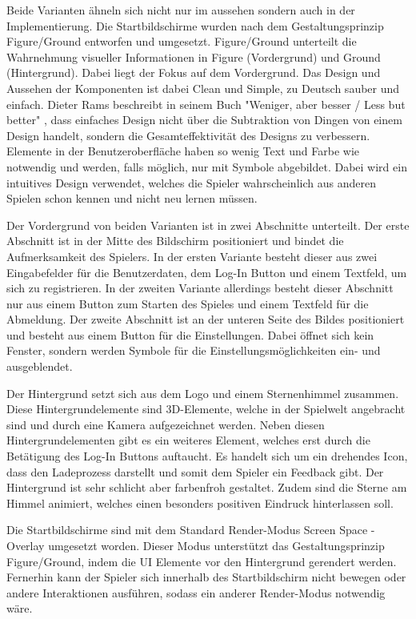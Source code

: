 			Beide Varianten ähneln sich nicht nur im aussehen sondern auch in der Implementierung. Die Startbildschirme wurden nach dem Gestaltungsprinzip Figure/Ground entworfen und umgesetzt. Figure/Ground unterteilt die Wahrnehmung visueller Informationen in Figure (Vordergrund) und Ground (Hintergrund). Dabei liegt der Fokus auf dem Vordergrund. Das Design und Aussehen der Komponenten ist dabei Clean und Simple, zu Deutsch sauber und einfach. Dieter Rams beschreibt in seinem Buch "Weniger, aber besser / Less but better" \cite{ramsDesign}, dass einfaches Design nicht über die Subtraktion von Dingen von einem Design handelt, sondern die Gesamteffektivität des Designs zu verbessern. Elemente in der Benutzeroberfläche haben so wenig Text und Farbe wie notwendig und werden, falls möglich, nur mit Symbole abgebildet. Dabei wird ein intuitives Design verwendet, welches die Spieler wahrscheinlich aus anderen Spielen schon kennen und nicht neu lernen müssen.
			
			Der Vordergrund von beiden Varianten ist in zwei Abschnitte unterteilt. Der erste Abschnitt ist in der Mitte des Bildschirm positioniert und bindet die Aufmerksamkeit des Spielers. In der ersten Variante besteht dieser aus zwei Eingabefelder für die Benutzerdaten, dem Log-In Button und einem Textfeld, um sich zu registrieren. In der zweiten Variante allerdings besteht dieser Abschnitt nur aus einem Button zum Starten des Spieles und einem Textfeld für die Abmeldung. Der zweite Abschnitt ist an der unteren Seite des Bildes positioniert und besteht aus einem Button für die Einstellungen. Dabei öffnet sich kein Fenster, sondern werden Symbole für die Einstellungsmöglichkeiten ein- und ausgeblendet.
			
			Der Hintergrund setzt sich aus dem Logo und einem Sternenhimmel zusammen. Diese Hintergrundelemente sind 3D-Elemente, welche in der Spielwelt angebracht sind und durch eine Kamera aufgezeichnet werden. Neben diesen Hintergrundelementen gibt es ein weiteres Element, welches erst durch die Betätigung des Log-In Buttons auftaucht. Es handelt sich um ein drehendes Icon, dass den Ladeprozess darstellt und somit dem Spieler ein Feedback gibt. Der Hintergrund ist sehr schlicht aber farbenfroh gestaltet. Zudem sind die Sterne am Himmel animiert, welches einen besonders positiven Eindruck hinterlassen soll.
			
			Die Startbildschirme sind mit dem Standard Render-Modus Screen Space - Overlay umgesetzt worden. Dieser Modus unterstützt das Gestaltungsprinzip Figure/Ground, indem die UI Elemente vor den Hintergrund gerendert werden. Fernerhin kann der Spieler sich innerhalb des Startbildschirm nicht bewegen oder andere Interaktionen ausführen, sodass ein anderer Render-Modus notwendig wäre.

